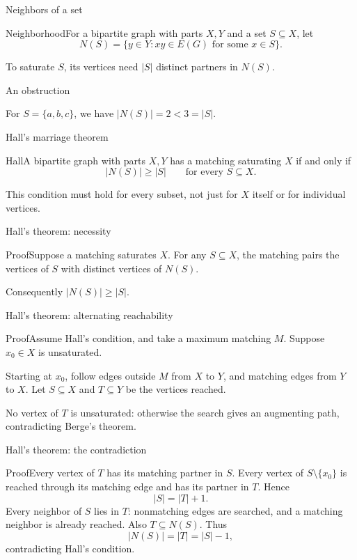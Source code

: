 \documentclass[aspectratio=169,11pt]{beamer}
\newcommand{\Def}[2]{\begin{block}{#1}#2\end{block}}
\newcommand{\Thm}[2]{\begin{block}{#1}#2\end{block}}
\renewcommand{\Proof}[1]{\begin{block}{Proof}\normalsize #1\end{block}}
\newcommand{\gap}{\par\medskip}
\begin{document}
\begin{frame}{Neighbors of a set}
\large
\Def{Neighborhood}{For a bipartite graph with parts $X,Y$ and a set $S\subseteq X$, let
\[N(S)=\{y\in Y:xy\in E(G)\text{ for some }x\in S\}.\]}
\gap To saturate $S$, its vertices need $|S|$ distinct partners in $N(S)$.
\end{frame}
\begin{frame}{An obstruction}
\large
\begin{center}\end{center}
\begin{center}For $S=\{a,b,c\}$, we have $|N(S)|=2<3=|S|$.\end{center}
\end{frame}
\begin{frame}{Hall's marriage theorem}
\large
\Thm{Hall}{A bipartite graph with parts $X,Y$ has a matching saturating $X$ if and only if
\[|N(S)|\geq |S|\qquad\text{for every }S\subseteq X.\]}
\gap This condition must hold for every subset, not just for $X$ itself or for individual vertices.
\end{frame}
\begin{frame}{Hall's theorem: necessity}
\large
\Proof{Suppose a matching saturates $X$. For any $S\subseteq X$, the matching pairs the vertices of $S$ with distinct vertices of $N(S)$.\gap Consequently $|N(S)|\geq |S|$.}
\end{frame}
\begin{frame}{Hall's theorem: alternating reachability}
\large
\Proof{Assume Hall's condition, and take a maximum matching $M$. Suppose $x_0\in X$ is unsaturated.\gap Starting at $x_0$, follow edges outside $M$ from $X$ to $Y$, and matching edges from $Y$ to $X$. Let $S\subseteq X$ and $T\subseteq Y$ be the vertices reached.\gap No vertex of $T$ is unsaturated: otherwise the search gives an augmenting path, contradicting Berge's theorem.}
\end{frame}
\begin{frame}{Hall's theorem: the contradiction}
\large
\Proof{Every vertex of $T$ has its matching partner in $S$. Every vertex of $S\setminus\{x_0\}$ is reached through its matching edge and has its partner in $T$. Hence
\[|S|=|T|+1.\]
Every neighbor of $S$ lies in $T$: nonmatching edges are searched, and a matching neighbor is already reached. Also $T\subseteq N(S)$. Thus
\[|N(S)|=|T|=|S|-1,\]
contradicting Hall's condition.}
\end{frame}
\end{document}
